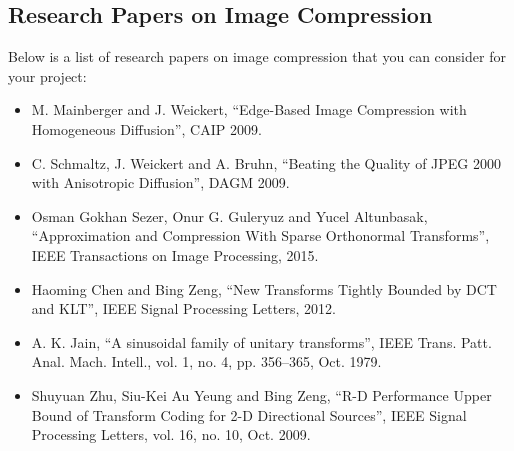 \documentclass[11pt]{article}
\begin{document}
\subsection*{Research Papers on Image Compression}

Below is a list of research papers on image compression that you can consider for your project:
\begin{itemize}
    \item M. Mainberger and J. Weickert, ``Edge-Based Image Compression with Homogeneous Diffusion'', CAIP 2009.
    \item C. Schmaltz, J. Weickert and A. Bruhn, ``Beating the Quality of JPEG 2000 with Anisotropic Diffusion'', DAGM 2009.
    \item Osman Gokhan Sezer, Onur G. Guleryuz and Yucel Altunbasak, ``Approximation and Compression With Sparse Orthonormal Transforms'', IEEE Transactions on Image Processing, 2015.
    \item Haoming Chen and Bing Zeng, ``New Transforms Tightly Bounded by DCT and KLT'', IEEE Signal Processing Letters, 2012.
    \item A. K. Jain, ``A sinusoidal family of unitary transforms'', IEEE Trans. Patt. Anal. Mach. Intell., vol. 1, no. 4, pp. 356–365, Oct. 1979.
    \item Shuyuan Zhu, Siu-Kei Au Yeung and Bing Zeng, ``R-D Performance Upper Bound of Transform Coding for 2-D Directional Sources'', IEEE Signal Processing Letters, vol. 16, no. 10, Oct. 2009.
\end{itemize}
\end{document}
